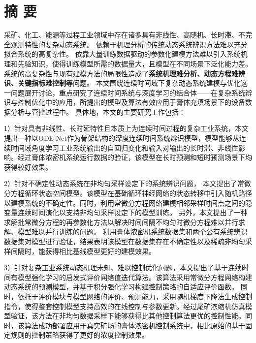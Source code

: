 
\chapter*{ 摘 \space 要 }

采矿、化工、能源等过程工业领域中存在诸多具有非线性、高随机、长时滞、不完全观测特性的复杂动态系统。
依赖于机理分析的传统动态系统辨识方法难以充分拟合系统的高复杂性。
依靠大量训练数据驱动的参数化建模方法难以引入系统机理和先验知识，使得训练模型所需的数据量大，且模型在不同场景下泛化能力差。
系统的高复杂性与现有建模方法的局限性造成了\textbf{系统机理难分析、动态方程难辨识、关键指标难控制}等问题。
本文围绕连续时间域下复杂动态系统建模与优化这一问题展开讨论，重点研究了连续时间系统与深度学习的结合体——在复杂系统辨识与控制优化中的应用，所提出的模型及算法有效应用于膏体充填场景下的设备数据分析与管控过程中。
具体地，本文的主要研究工作包括：

1）针对具有非线性、长时延特性且本质上为连续时间过程的复杂工业系统，本文提出一种以ODE-Net作为骨架结构的深度连续时间系统辨识模型，模型能够从连续时间域角度学习工业系统输出的自回归变化和输入对输出的长时滞、非线性影响。经过膏体浓密机系统运行数据的验证，该模型在长时预测和短时预测场景下均获得较好效果。   

2）针对不确定性动态系统在非均匀采样设定下的系统辨识问题，
本文提出了常微分方程循环状态空间模型。该模型在基础循环神经网络的状态转移中引入随机路径以建模系统的不确定性。同时，利用常微分方程网络建模相邻采样时间点之间的隐变量连续时间演化以支持非均匀采样设定下的模型训练。
另外，本文提出了一种求解批常微分方程的再参数化方法以解决时间间隔不均匀时微分方程难以并行求解、模型难以并行训练的问题。
利用膏体浓密机系统数据集和两个公有系统辨识数据集对模型进行验证，结果表明该模型在数据集存在不确定性以及稀疏非均匀采样间隔时，能获得相比基线模型更好的建模效果。

3）针对复杂工业系统动态机理未知、难以控制优化问题，本文提出了基于连续时间有模型强化学习的启发式评价网络值迭代算法。该算法采用常微分方程网络构建动态系统的预测模型，并基于积分强化学习构建控制策略的自适应评价函数。
同时，依托于评价模块与模型网络的评价、预测能力，采用随机梯度下降法生成控制指令，使得整套控制模型支持高效的在线控制与参数更新。经过尾矿浓缩机仿真模型验证，该方法在非均匀数据采样下能够获得比其他控制算法更优的控制性能。同时，该算法成功部署应用于真实矿场的膏体浓密机控制系统中，相比原始的基于固定规则的控制策略获得了更好的浓度控制效果。

